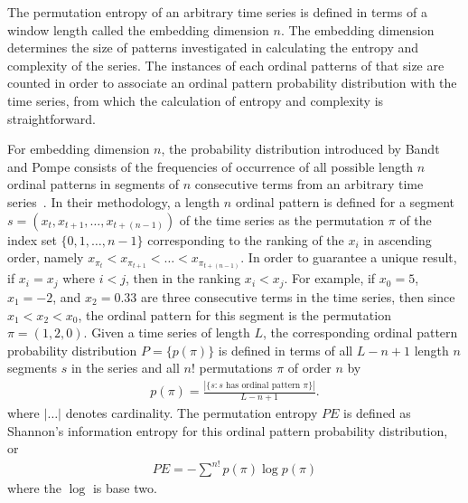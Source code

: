 \documentclass[aps,prx,twocolumn,secnumarabic,nobalancelastpage,amsmath,amssymb,
nofootinbib]{revtex4-1}
\begin{document}
The permutation entropy of an arbitrary time series is defined in terms of a window length called the embedding dimension $n$. The embedding dimension determines the size of patterns investigated in calculating the entropy and complexity of the series. The instances of each ordinal patterns of that size are counted in order to associate an ordinal pattern probability distribution with the time series, from which the calculation of entropy and complexity is straightforward.

For embedding dimension $n$, the probability distribution introduced by Bandt and Pompe consists of the frequencies of occurrence of all possible length $n$ ordinal patterns in segments of $n$ consecutive terms from an arbitrary time series~\cite{bandt2002}. In their methodology, a length $n$ ordinal pattern is defined for a segment $s = ( x_t,x_{t+1},\ldots,x_{t+(n-1)} )$ of the time series as the permutation $\pi$ of the index set $\{0,1,\ldots,n-1 \}$ corresponding to the ranking of the $x_i$ in ascending order, namely $x_{\pi_t}< x_{\pi_{t+1}}<\ldots< x_{\pi_{t+(n-1)}}$. In order to guarantee a unique result, if $x_i = x_j$ where $i<j$, then in the ranking $x_i <x_j$. For example, if $x_0 = 5$, $x_1= -2$, and $x_2 = 0.33$ are three consecutive terms in the time series, then since $x_1 < x_2 < x_0$, the ordinal pattern for this segment is the permutation $\pi = (1,2,0)$. Given a time series of length $L$, the corresponding ordinal pattern probability distribution $P= \{p(\pi) \}$ is defined in terms of all $L-n+1$ length $n$ segments $s$ in the series and all $n!$ permutations $\pi$ of order $n$ by
\begin{align}
p(\pi) = \frac{|\{s: \text{$s$ has ordinal pattern $\pi$}\}| }{L-n+1}. 
\end{align}
where $|\ldots|$ denotes cardinality. The permutation entropy $PE$ is defined as Shannon's information entropy for this ordinal pattern probability distribution, or
\begin{align}
PE = -\sum^{n!} p(\pi) \log p(\pi)
\end{align}
where the $\log$ is base two.
\end{document}
